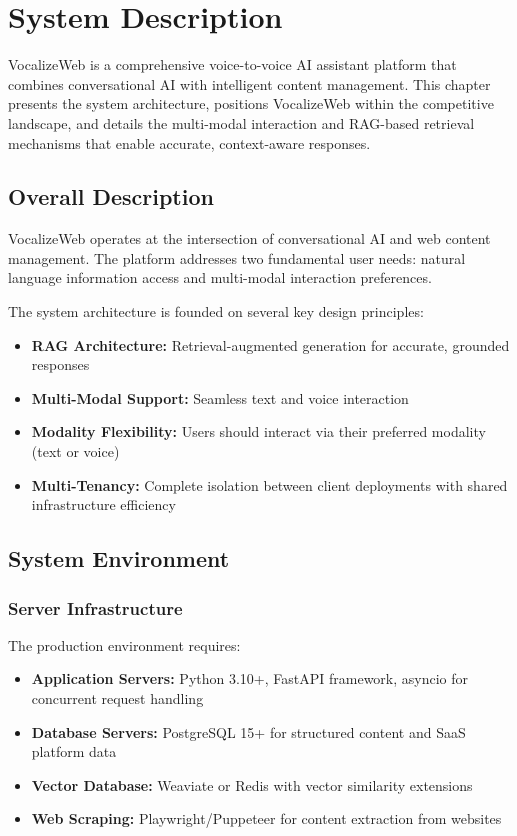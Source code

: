\chapter{System Description}

VocalizeWeb is a comprehensive voice-to-voice AI assistant platform that combines conversational AI with intelligent content management. This chapter presents the system architecture, positions VocalizeWeb within the competitive landscape, and details the multi-modal interaction and RAG-based retrieval mechanisms that enable accurate, context-aware responses.

\section{Overall Description}

VocalizeWeb operates at the intersection of conversational AI and web content management. The platform addresses two fundamental user needs: natural language information access and multi-modal interaction preferences.

The system architecture is founded on several key design principles:
\begin{itemize}[leftmargin=*]
    \item \textbf{RAG Architecture:} Retrieval-augmented generation for accurate, grounded responses
    \item \textbf{Multi-Modal Support:} Seamless text and voice interaction
    \item \textbf{Modality Flexibility:} Users should interact via their preferred modality (text or voice)
    \item \textbf{Multi-Tenancy:} Complete isolation between client deployments with shared infrastructure efficiency
\end{itemize}

\section{System Environment}

\subsection{Server Infrastructure}

The production environment requires:
\begin{itemize}[leftmargin=*]
    \item \textbf{Application Servers:} Python 3.10+, FastAPI framework, asyncio for concurrent request handling
    \item \textbf{Database Servers:} PostgreSQL 15+ for structured content and SaaS platform data
    \item \textbf{Vector Database:} Weaviate or Redis with vector similarity extensions
    \item \textbf{Web Scraping:} Playwright/Puppeteer for content extraction from websites
\end{itemize}

